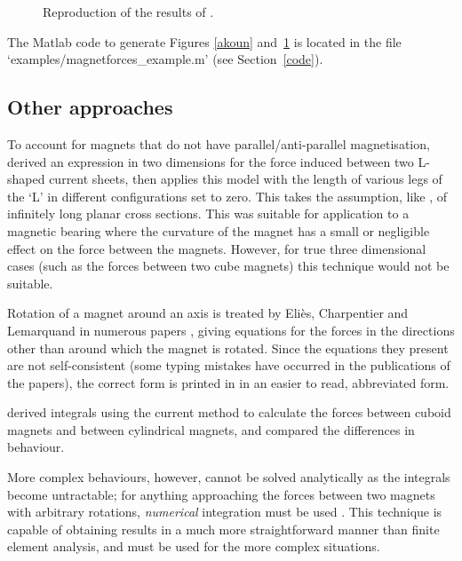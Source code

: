 \begin{figure}
\centering
{}
\caption{Reproduction of the results of \textcite{janssen2009-sensorletters}.}
\label{janssen}
\end{figure}

The Matlab code to generate Figures \ref{akoun} and~\ref{janssen} is located in the file `examples/magnetforces\_example.m' (see Section~\ref{code}).


\subsection{Other approaches}

To account for magnets that do not have parallel/anti-parallel
magnetisation, \textcite{chen2002,chen2003} derived an expression in two
dimensions for the force induced between two L-shaped current
sheets, then applies this model with the length
of various legs of the `L' in different configurations set to zero. This
takes the assumption, like \textcite{yonnet1981}, of infinitely long
planar cross sections.
This was suitable for application to a magnetic bearing where
the curvature of the magnet has a small or negligible effect on the
force between the magnets. However, for true three dimensional cases
(such as the forces between two cube magnets) this technique would not
be suitable.

Rotation of a magnet around an axis is treated by Eliès, Charpentier and
Lemarquand in numerous papers
\cite{elies1998,charpentier1999-ietm-mar,charpentier1999-ietm-sep,elies1999a}, giving equations
for the forces in the directions other than around which the magnet is
rotated. Since the equations they present are not self-consistent (some typing
mistakes have occurred in the publications of the papers), the correct form is
printed in  in an easier to read, abbreviated form.

\textcite{nagaraj1988} derived integrals using the current method
 to calculate the forces between cuboid magnets and
between cylindrical magnets, and compared the differences in
behaviour.

More complex behaviours, however, cannot be solved analytically as the
integrals become untractable; for anything approaching the forces
between two magnets with arbitrary rotations, \emph{numerical}
integration must be used \cite{elies1999a}. This technique is capable
of obtaining results in a much more straightforward manner than finite
element analysis, and must be used for the more complex situations.

